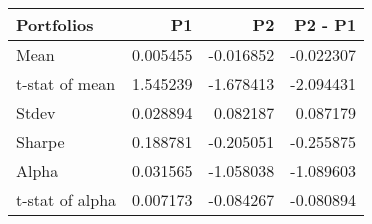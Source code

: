 \begin{tabular}{lrrr}
\toprule
Portfolios & P1 & P2 & P2 - P1 \\
\midrule
Mean & 0.005455 & -0.016852 & -0.022307 \\
t-stat of mean & 1.545239 & -1.678413 & -2.094431 \\
Stdev & 0.028894 & 0.082187 & 0.087179 \\
Sharpe & 0.188781 & -0.205051 & -0.255875 \\
Alpha & 0.031565 & -1.058038 & -1.089603 \\
t-stat of alpha & 0.007173 & -0.084267 & -0.080894 \\
\bottomrule
\end{tabular}
